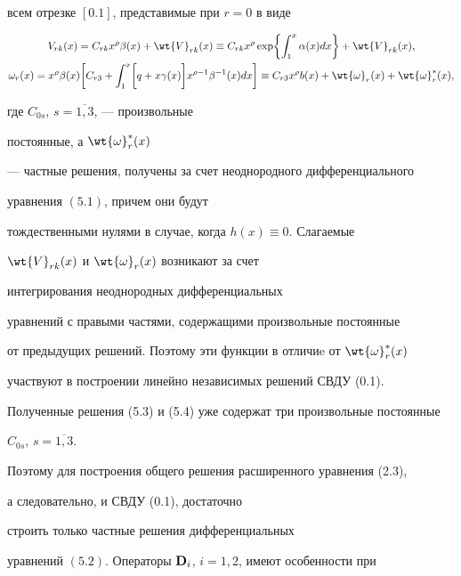 всем отрезке $[0.1]$, представимые при $r = 0$ в виде


\begin{gather}


V_{rk} (x) = C_{rk} x^{\rho} \beta (x)+ \wt{V}_{rk} (x) \equiv


C_{rk} x^{\rho} \exp \biggl\{ \int _1^x \aa(x) d x


\biggr\}+ \wt{V}_{rk} (x), \\


%


\o_{r} (x) = x^{\rho} \beta (x) \biggl[ C_{r3} + \int _1^x


\biggl[ q + x \gamma (x) \biggr] x^{\rho -1} \beta^{-1} (x) d x


\biggr] \equiv C_{r3} x^{\rho} b (x) + \wt{ \o}_r (x) +


\wt{\o}_r^* (x),


\end{gather}


где $C_{0s}$, $s=\overline{1,3}$, --- произвольные 


постоянные, а $\wt{\o}_r^* (x)$


--- частные решения, получены за счет неоднородного дифференциального


уравнения $(5.1)$, причем они будут


тождественными нулями в случае, когда $h (x) \equiv 0$. Слагаемые


$ \wt{V}_{rk} (x)$ и $\wt{\o}_r (x)$ возникают за счет


интегрирования неоднородных дифференциальных


уравнений с правыми частями, содержащими произвольные постоянные


от предыдущих решений. Поэтому эти функции в отличиe от $\wt{\o}_r^* (x)$


участвуют в построении линейно независимых решений СВДУ (0.1).





Полученные решения (5.3) и (5.4) уже содержат три произвольные постоянные


$C_{0s}$, $s=\overline{1,3}$.


Поэтому для построения общего решения расширенного уравнения (2.3),


а следовательно, и СВДУ (0.1), достаточно


строить только частные решения дифференциальных


уравнений $(5.2)$. Операторы $\bold{D}_i$, $i=1, 2$, имеют особенности при


